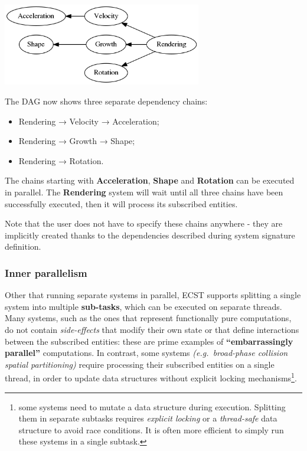 \documentclass[twoside, 12pt, a4paper, openany]{book}
\let\origfigure=\figure
\let\endorigfigure=\endfigure
\renewenvironment{figure}[1][]{%
\origfigure[H]
}{%
\endorigfigure
}
\begin{document}
\begin{figure}[htbp]
\centering
\includegraphics[width=0.65000\textwidth]{source/figures/generated/ecst/overview/multithreading/outer/dag1.png}
\caption{ECST multithreading: example outer parallelism DAG \#1}
\end{figure}

The DAG now shows three separate dependency chains:

\begin{itemize}
\item
  Rendering → Velocity → Acceleration;
\item
  Rendering → Growth → Shape;
\item
  Rendering → Rotation.
\end{itemize}

The chains starting with \textbf{Acceleration}, \textbf{Shape} and
\textbf{Rotation} can be executed in parallel. The \textbf{Rendering}
system will wait until all three chains have been successfully executed,
then it will process its subscribed entities.

Note that the user does not have to specify these chains anywhere - they
are implicitly created thanks to the dependencies described during
system signature definition.

\subsubsection{Inner parallelism}\label{inner-parallelism}

Other that running separate systems in parallel, ECST supports splitting
a single system into multiple \textbf{sub-tasks}, which can be executed
on separate threads. Many systems, such as the ones that represent
functionally pure computations, do not contain \emph{side-effects} that
modify their own state or that define interactions between the
subscribed entities: these are prime examples of
\textbf{``embarrassingly parallel''} computations. In contrast, some
systems \emph{(e.g.~broad-phase collision spatial partitioning)} require
processing their subscribed entities on a single thread, in order to
update data structures without explicit locking mechanisms\footnote{some
  systems need to mutate a data structure during execution. Splitting
  them in separate subtasks requires \emph{explicit locking} or a
  \emph{thread-safe} data structure to avoid race conditions. It is
  often more efficient to simply run these systems in a single subtask.}.
\end{document}
